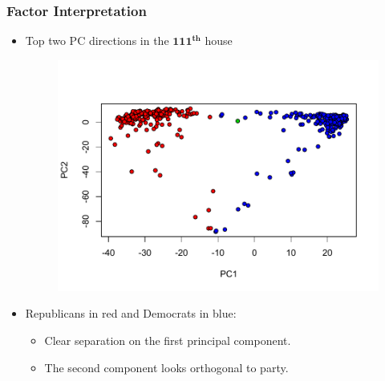 \documentclass[
  shownotes,
  xcolor={svgnames},
  hyperref={colorlinks,citecolor=DarkBlue,linkcolor=DarkRed,urlcolor=DarkBlue}
  , aspectratio=169]{beamer}
\newcommand{\bs}[1]{\boldsymbol{#1}}
\begin{document}
\begin{frame}[fragile]
\frametitle{Factor Interpretation}

\begin{itemize}
\item Top two PC directions in the $\bs{111^{th}}$ house



  \begin{figure}[H] \centering
            \captionsetup{justification=centering}
              \includegraphics[scale=.5]{figures/VOTEpc}
 \end{figure}




  \item Republicans in red and Democrats in blue: 
  \begin{itemize}
  \item Clear separation on the first principal component.
  \item The second component looks orthogonal to party.
  \end{itemize}
\end{itemize}


\end{frame}
\end{document}
